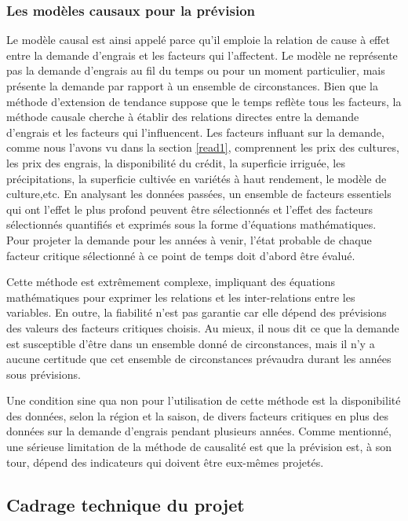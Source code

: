 	\subsubsection{Les modèles causaux pour la prévision}
	Le modèle causal est ainsi appelé parce qu'il emploie la relation de cause à effet entre la demande d'engrais et les facteurs qui l'affectent. Le modèle ne représente pas la demande d'engrais au fil du temps ou pour un moment particulier, mais présente la demande par rapport à un ensemble de circonstances. Bien que la méthode d'extension de tendance suppose que le temps reflète tous les facteurs, la méthode causale cherche à établir des relations directes entre la demande d'engrais et les facteurs qui l'influencent. Les facteurs influant sur la demande, comme nous l'avons vu dans la section \ref{read1}, comprennent les prix des cultures, les prix des engrais, la disponibilité du crédit, la superficie irriguée, les précipitations, la superficie cultivée en variétés à haut rendement, le modèle de culture,etc. En analysant les données passées, un ensemble de facteurs essentiels qui ont l'effet le plus profond peuvent être sélectionnés et l'effet des facteurs sélectionnés quantifiés et exprimés sous la forme d'équations mathématiques. Pour projeter la demande pour les années à venir, l'état probable de chaque facteur critique sélectionné à ce point de temps doit d'abord être évalué.
	
	Cette méthode est extrêmement complexe, impliquant des équations mathématiques pour exprimer les relations et les inter-relations entre les variables. En outre, la fiabilité n'est pas garantie car elle dépend des prévisions des valeurs des facteurs critiques choisis. Au mieux, il nous dit ce que la demande est susceptible d'être dans un ensemble donné de circonstances, mais il n'y a aucune certitude que cet ensemble de circonstances prévaudra durant les années sous prévisions.
	
	Une condition sine qua non pour l'utilisation de cette méthode est la disponibilité des données, selon la région et la saison, de divers facteurs critiques en plus des données sur la demande d'engrais pendant plusieurs années. Comme mentionné, une sérieuse limitation de la méthode de causalité est que la prévision est, à son tour, dépend des indicateurs qui doivent être eux-mêmes projetés.
	\subsection{Cadrage technique du projet}
